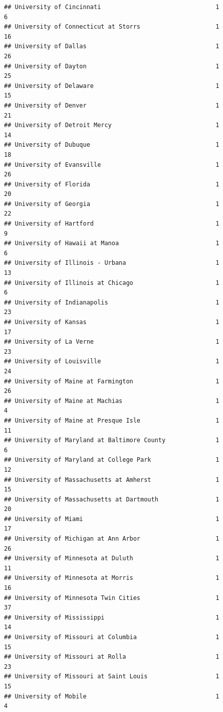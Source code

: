 \documentclass[
]{article}
\begin{document}
\begin{verbatim}
## University of Cincinnati                                1           6
## University of Connecticut at Storrs                     1          16
## University of Dallas                                    1          26
## University of Dayton                                    1          25
## University of Delaware                                  1          15
## University of Denver                                    1          21
## University of Detroit Mercy                             1          14
## University of Dubuque                                   1          18
## University of Evansville                                1          26
## University of Florida                                   1          20
## University of Georgia                                   1          22
## University of Hartford                                  1           9
## University of Hawaii at Manoa                           1           6
## University of Illinois - Urbana                         1          13
## University of Illinois at Chicago                       1           6
## University of Indianapolis                              1          23
## University of Kansas                                    1          17
## University of La Verne                                  1          23
## University of Louisville                                1          24
## University of Maine at Farmington                       1          26
## University of Maine at Machias                          1           4
## University of Maine at Presque Isle                     1          11
## University of Maryland at Baltimore County              1           6
## University of Maryland at College Park                  1          12
## University of Massachusetts at Amherst                  1          15
## University of Massachusetts at Dartmouth                1          20
## University of Miami                                     1          17
## University of Michigan at Ann Arbor                     1          26
## University of Minnesota at Duluth                       1          11
## University of Minnesota at Morris                       1          16
## University of Minnesota Twin Cities                     1          37
## University of Mississippi                               1          14
## University of Missouri at Columbia                      1          15
## University of Missouri at Rolla                         1          23
## University of Missouri at Saint Louis                   1          15
## University of Mobile                                    1           4

\end{verbatim}
\end{document}
